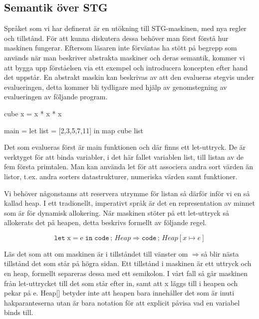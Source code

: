 \documentclass[../Core]{subfiles}
\begin{document}
\subsection{Semantik över STG}





Språket som vi har definerat är en utökning till STG-maskinen, med
nya regler och tillstånd. För att kunna diskutera dessa behöver man
först förstå hur maskinen fungerar. Eftersom läsaren inte förväntas
ha stött på begrepp som används när man beskriver abstrakta maskiner
och deras semantik, kommer vi att bygga upp förståelsen via ett exempel
och introducera koncepten efter hand det uppstår. En abstrakt maskin kan beskrivas
av att den evalueras stegvis under evalueringen, detta kommer bli
tydligare med hjälp av genomstegning av evalueringen av följande program.

\begin{codeEx}
cube x = x * x * x

main = let list = [2,3,5,7,11]
        in map cube list
\end{codeEx}

Det som evalueras först är main funktionen och där finns ett let-uttryck.
De är verktyget för att binda variabler, i det här fallet variablen
list, till listan av de fem första primtalen. Man kan använda let
för att associera andra sort värden än listor, t.ex. andra sorters
datastrukturer, numeriska värden samt funktioner.

Vi behöver någonstanns att reservera utrymme för listan så därför
inför vi en så kallad heap. I ett tradionellt, imperativt språk är
det en representation av minnet som är för dynamisk allokering. När
maskinen stöter på ett let-uttryck så allokerats det på heapen, detta
beskrivs formellt av följande regel.

\[
\mathtt{let\;\mathrm{x\mathtt{=}e}\; in\; code}\,;\, Heap\Rightarrow\mathtt{code}\,;\, Heap[x\mapsto e]\]


Läs det som att om maskinen är i tillståndet till vänster om $\Rightarrow$så
blir nästa tillstånd det som står på högra sidan. Ett tillstånd i
maskinen är ett uttryck och en heap, formellt separeras dessa med
ett semikolon. I vårt fall så går maskinen från let-uttrycket till
det som står efter in, samt att x läggs till i heapen och pekar på
e. Heap{[}{]} betyder inte att heapen bara innehåller det som är inuti
hakparanteserna utan är bara notation för att explicit påvisa vad
en variabel binds till.
\end{document}

